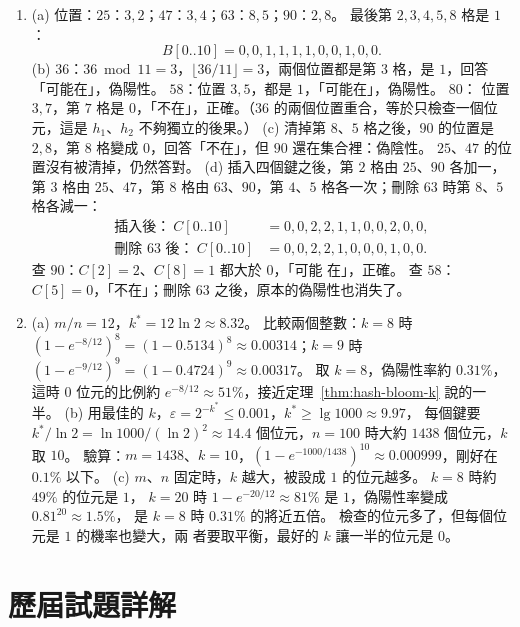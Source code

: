 \begin{enumerate}[itemsep=0.15em]
\item (a) 位置：$25$：$3, 2$；$47$：$3, 4$；$63$：$8, 5$；$90$：$2, 8$。 最後第
$2, 3, 4, 5, 8$ 格是 $1$：
\[
B[0..10] = 0, 0, 1, 1, 1, 1, 0, 0, 1, 0, 0.
\]
(b) $36$：$36 \bmod 11 = 3$，$\lfloor 36/11 \rfloor = 3$，兩個位置都是第 $3$ 格，是
$1$，回答「可能在」，偽陽性。 $58$：位置 $3, 5$，都是 $1$，「可能在」，偽陽性。 $80$：
位置 $3, 7$，第 $7$ 格是 $0$，「不在」，正確。（$36$ 的兩個位置重合，等於只檢查一個位
元，這是 $h_1$、$h_2$ 不夠獨立的後果。）
(c) 清掉第 $8$、$5$ 格之後，$90$ 的位置是 $2, 8$，第 $8$ 格變成 $0$，回答「不在」，但
$90$ 還在集合裡：偽陰性。 $25$、$47$ 的位置沒有被清掉，仍然答對。
(d) 插入四個鍵之後，第 $2$ 格由 $25$、$90$ 各加一，第 $3$ 格由 $25$、$47$，第 $8$ 格由
$63$、$90$，第 $4$、$5$ 格各一次；刪除 $63$ 時第 $8$、$5$ 格各減一：
\[
\begin{aligned}
\text{插入後：}\ C[0..10] &= 0, 0, 2, 2, 1, 1, 0, 0, 2, 0, 0, \\
\text{刪除 $63$ 後：}\ C[0..10] &= 0, 0, 2, 2, 1, 0, 0, 0, 1, 0, 0.
\end{aligned}
\]
查 $90$：$C[2] = 2$、$C[8] = 1$ 都大於 $0$，「可能
在」，正確。 查 $58$：$C[5] = 0$，「不在」；刪除 $63$ 之後，原本的偽陽性也消失了。

\item (a) $m/n = 12$，$k^{*} = 12 \ln 2 \approx 8.32$。 比較兩個整數：$k = 8$ 時
$(1 - e^{-8/12})^8 = (1 - 0.5134)^8 \approx 0.00314$；$k = 9$ 時
$(1 - e^{-9/12})^9 = (1 - 0.4724)^9 \approx 0.00317$。 取 $k = 8$，偽陽性率約
$0.31\%$，這時 $0$ 位元的比例約 $e^{-8/12} \approx 51\%$，接近定理~\ref{thm:hash-bloom-k}
說的一半。
(b) 用最佳的 $k$，$\varepsilon = 2^{-k^{*}} \le 0.001$，$k^{*} \ge \lg 1000 \approx 9.97$，
每個鍵要 $k^{*}/\ln 2 = \ln 1000 / (\ln 2)^2 \approx 14.4$ 個位元，$n = 100$ 時大約
$1438$ 個位元，$k$ 取 $10$。 驗算：$m = 1438$、$k = 10$，$(1 - e^{-1000/1438})^{10}
\approx 0.000999$，剛好在 $0.1\%$ 以下。
(c) $m$、$n$ 固定時，$k$ 越大，被設成 $1$ 的位元越多。 $k = 8$ 時約 $49\%$ 的位元是 $1$，
$k = 20$ 時 $1 - e^{-20/12} \approx 81\%$ 是 $1$，偽陽性率變成 $0.81^{20} \approx 1.5\%$，
是 $k = 8$ 時 $0.31\%$ 的將近五倍。 檢查的位元多了，但每個位元是 $1$ 的機率也變大，兩
者要取平衡，最好的 $k$ 讓一半的位元是 $0$。
\end{enumerate}

\section*{歷屆試題詳解}

